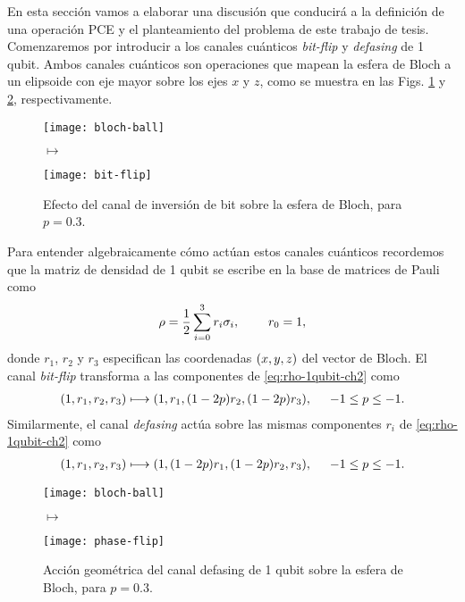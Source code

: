En esta sección vamos a elaborar una discusión que conducirá a
la definición de una operación PCE y el planteamiento del problema
de este trabajo de tesis. 
Comenzaremos por introducir a los canales cuánticos  
\textit{bit-flip} y \textit{defasing} de 1 qubit. 
Ambos canales cuánticos son operaciones que mapean 
la esfera de Bloch a un elipsoide con eje mayor sobre los ejes $x$ y $z$, 
como se muestra en las Figs. \ref{fig:bit-flip} y \ref{fig:phase-flip}, 
respectivamente.
\begin{figure}
\centering
\begin{minipage}{.4\textwidth}
    \centering
    \texttt{[image: bloch-ball]}
\end{minipage}
\LARGE{$\longmapsto$}
\begin{minipage}{0.4\textwidth}
    \centering
    \texttt{[image: bit-flip]}
\end{minipage}
\caption{
Efecto del canal de inversión de bit sobre la esfera de Bloch, para $p=0.3$.}
\label{fig:bit-flip}
\end{figure}
Para entender algebraicamente cómo actúan estos canales cuánticos 
recordemos que la matriz de densidad de 1 qubit se escribe en la 
base de matrices de Pauli como
\begin{align}\label{eq:rho-1qubit-ch2}
\rho=\frac{1}{2}\sum_{i=0}^3r_i\sigma_i,\hspace{.8cm}r_0=1,
\end{align}
donde $r_1$, $r_2$ y $r_3$ especifican las coordenadas $\qty(x,y,z)$ 
del vector de Bloch. El canal \textit{bit-flip} transforma a las componentes 
de \eqref{eq:rho-1qubit-ch2} como~\cite{nielsen_chuang_2011}
\begin{align}\label{eq:bit-flip-transformation}
\qty(1,r_1,r_2,r_3)\longmapsto \qty(1,r_1,(1-2p)r_2,(1-2p)r_3),
\hspace{.5cm} -1\leq p\leq-1.
\end{align}
Similarmente, el canal \textit{defasing} actúa sobre las mismas
componentes $r_i$ de \eqref{eq:rho-1qubit-ch2}
como~\cite{nielsen_chuang_2011}
\begin{align}\label{eq:defasing-transformation}
\qty(1,r_1,r_2,r_3)\longmapsto \qty(1,(1-2p)r_1,(1-2p)r_2,r_3),
\hspace{.5cm} -1\leq p\leq-1.
\end{align}
\begin{figure}
\centering
\begin{minipage}{.4\textwidth}
    \centering
    \texttt{[image: bloch-ball]}
\end{minipage}
\LARGE{$\longmapsto$}
\begin{minipage}{0.4\textwidth}
    \centering
    \texttt{[image: phase-flip]}
\end{minipage}
\caption{
Acción geométrica del canal defasing de 1 qubit sobre la 
esfera de Bloch, para $p=0.3$.}
\label{fig:phase-flip}
\end{figure}
